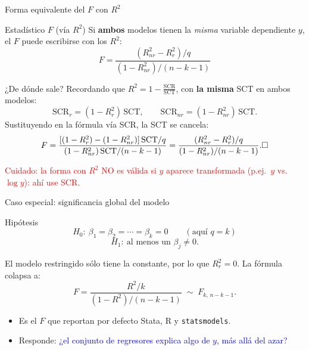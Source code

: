 \documentclass{beamer}
\begin{document}
\begin{frame}{Forma equivalente del $F$ con $R^2$}
\begin{alertblock}{Estadístico $F$ (vía $R^2$)}
Si \textbf{ambos} modelos tienen la \emph{misma} variable dependiente $y$, el $F$ puede escribirse con los $R^2$:
\[
\boxed{\,F = \frac{(R^2_{nr} - R^2_{r})/q}{(1 - R^2_{nr})/(n-k-1)}\,}
\]
\end{alertblock}
\begin{exampleblock}{¿De dónde sale?}
Recordando que $R^2 = 1 - \tfrac{\text{SCR}}{\text{SCT}}$, con \textbf{la misma} SCT en ambos modelos:
\[
\text{SCR}_r = (1-R^2_r)\,\text{SCT}, \qquad \text{SCR}_{nr} = (1-R^2_{nr})\,\text{SCT}.
\]
Sustituyendo en la fórmula vía SCR, la SCT se cancela:
\[
F = \frac{[(1-R^2_r) - (1-R^2_{nr})]\,\text{SCT}/q}{(1-R^2_{nr})\,\text{SCT}/(n-k-1)}
  = \frac{(R^2_{nr}-R^2_r)/q}{(1-R^2_{nr})/(n-k-1)}.
\hfill \square
\]
\end{exampleblock}
\textcolor{red}{Cuidado: la forma con $R^2$ NO es válida si $y$ aparece transformada (p.ej.\ $y$ vs.\ $\log y$): ahí use SCR.}
\end{frame}

\begin{frame}{Caso especial: significancia global del modelo}
\begin{block}{Hipótesis}
\[
H_0:\ \beta_1 = \beta_2 = \cdots = \beta_k = 0
\qquad (\text{aquí } q = k)
\]
\[
H_1:\ \text{al menos un }\beta_j \neq 0 .
\]
\end{block}
El modelo restringido sólo tiene la constante, por lo que $R^2_r = 0$. La fórmula colapsa a:
\[
F = \frac{R^2/k}{(1-R^2)/(n-k-1)} \;\sim\; F_{k,\,n-k-1}.
\]
\begin{itemize}
    \item Es el $F$ que reportan por defecto Stata, R y \texttt{statsmodels}.
    \item Responde: \textcolor{blue}{¿el conjunto de regresores explica algo de $y$, más allá del azar?}
\end{itemize}
\end{frame}
\end{document}
